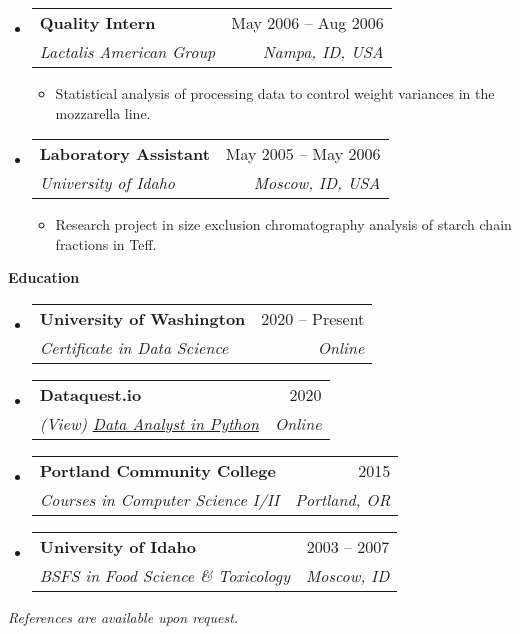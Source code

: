 \documentclass[letterpaper,12pt]{article}[leftmargin=*]
\makeatletter
\def \entryspacing {-0pt}
\newcommand{\education}[2]{\vspace{6pt}
  \colorbox{Copper}{\color{white}\raggedbottom\normalsize\textbf{{#1}{\hspace{9pt}#2\hspace{4pt}}}}
}
\newcommand{\resumeEntryStart}{\begin{itemize}[leftmargin=2.5mm]}
\newcommand{\resumeEntryEnd}{\end{itemize}\vspace{\entryspacing}}
\newcommand{\resumeItemListStart}{\begin{itemize}[leftmargin=4.5mm]}
\newcommand{\resumeItemListEnd}{\end{itemize}}
\newcommand{\resumeItem}[1]{
  \item\small{
    {#1 \vspace{-2pt}}
  }
}
\newcommand{\resumeEntryTSDL}[4]{
  \vspace{-1pt}\item[]
    \begin{tabularx}{0.97\textwidth}{X@{\hspace{60pt}}r}
      \textbf{\color{primary}#1} & {\firabook\color{accent}\small#2} \\
      \textit{\color{accent}\small#3} & \textit{\color{accent}\small#4} \\
    \end{tabularx}\vspace{-6pt}
}
\makeatother
\begin{document}
\resumeEntryStart
\resumeEntryTSDL
{Quality Intern}{May 2006 -- Aug 2006}
{Lactalis American Group}{Nampa, ID, USA}
\resumeItemListStart
\resumeItem {Statistical analysis of processing data to control weight variances in the mozzarella line.}
\resumeItemListEnd
\resumeEntryEnd

\resumeEntryStart
\resumeEntryTSDL
{Laboratory Assistant}{May 2005 -- May 2006}
{University of Idaho}{Moscow, ID, USA}
\resumeItemListStart
\resumeItem {Research project in size exclusion chromatography analysis of starch chain fractions in Teff.}
\resumeItemListEnd
\resumeEntryEnd

\education{\faGraduationCap}{Education}

\resumeEntryStart
\resumeEntryTSDL
{University of Washington}{2020 -- Present}
{Certificate in Data Science}{Online}
\resumeEntryTSDL
{Dataquest.io}{2020}
{(View) \href{https://app.dataquest.io/view_cert/G76HQZAT7X8UQNXKR3LR/}{\underline{Data Analyst in Python}}}{Online}
\resumeEntryTSDL
{Portland Community College}{2015}
{Courses in Computer Science I/II}{Portland, OR}
\resumeEntryTSDL
{University of Idaho}{2003 -- 2007}
{BSFS in Food Science \& Toxicology}{Moscow, ID}

\resumeEntryEnd

\bigskip

\begin{center}
  \color{accent}\small{\textit{References are available upon request.}}
\end{center}
\end{document}
